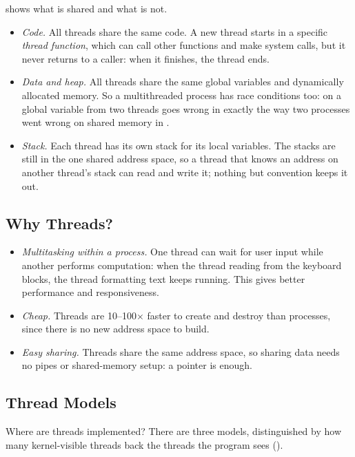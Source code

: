  shows what is shared and what is not.
\begin{itemize}
  \item \emph{Code.} All threads share the same code. A new thread starts in a specific \emph{thread function}, which can call other functions and make system calls, but it never returns to a caller: when it finishes, the thread ends.
  \item \emph{Data and heap.} All threads share the same global variables and dynamically allocated memory. So a multithreaded process has race conditions too:  on a global variable from two threads goes wrong in exactly the way two processes went wrong on shared memory in .
  \item \emph{Stack.} Each thread has its own stack for its local variables. The stacks are still in the one shared address space, so a thread that knows an address on another thread's stack can read and write it; nothing but convention keeps it out.
\end{itemize}

\subsection{Why Threads?}

\begin{itemize}
  \item \emph{Multitasking within a process.} One thread can wait for user input while another performs computation: when the thread reading from the keyboard blocks, the thread formatting text keeps running. This gives better performance and responsiveness.
  \item \emph{Cheap.} Threads are 10--100$\times$ faster to create and destroy than processes, since there is no new address space to build.
  \item \emph{Easy sharing.} Threads share the same address space, so sharing data needs no pipes or shared-memory setup: a pointer is enough.
\end{itemize}

\subsection{Thread Models}

Where are threads implemented? There are three models, distinguished by how many kernel-visible threads back the threads the program sees ().

